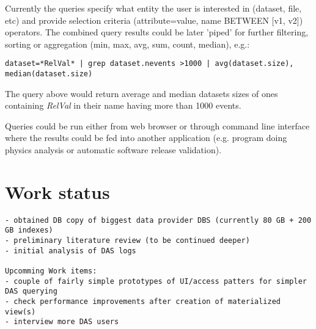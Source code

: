 \documentclass[a4paper,11pt,draft]{article}
\begin{document}
Currently the queries specify what entity the user is interested in (dataset, file, etc) and provide selection criteria (attribute=value, name BETWEEN [v1, v2]) operators. The combined query results could be later 'piped' for further filtering, sorting or aggregation (min, max, avg, sum, count, median), e.g.:

{\small 
\begin{verbatim}
dataset=*RelVal* | grep dataset.nevents >1000 | avg(dataset.size), median(dataset.size)
\end{verbatim}
}

The query above would return average and median datasets sizes  of ones containing  \textit{RelVal} in their name having more than 1000 events.

Queries could be run either from web browser or through  command line interface where the results could  be fed into another application (e.g. program doing physics analysis or automatic software release validation).










\section{Work status}
{\color{red}
\begin{verbatim}
- obtained DB copy of biggest data provider DBS (currently 80 GB + 200 GB indexes)
- preliminary literature review (to be continued deeper)
- initial analysis of DAS logs

Upcomming Work items:
- couple of fairly simple prototypes of UI/access patters for simpler DAS querying
- check performance improvements after creation of materialized view(s)
- interview more DAS users
\end{verbatim}
}


\thispagestyle{empty}
\begin{small}

\end{small}

\pagebreak

\end{document}
